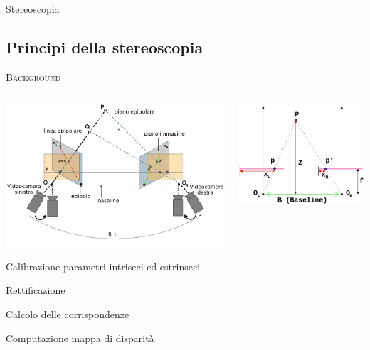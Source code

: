 \documentclass{beamer}
\begin{document}
\begin{section}{Stereoscopia}
\subsection{Principi della stereoscopia}

\begin{frame}[t]{\textsc{Background}}

\begin{columns}
\begin{column}{5cm}
\includegraphics[width=1.1\linewidth]{./img/rect.png}

\begin{itemize}
\item[1.] \small{Calibrazione parametri intriseci ed estrinseci
\item[2.] Rettificazione
\item[3.] Calcolo delle corrispondenze
\item[4.] Computazione mappa di disparit\`{a}}
\end{itemize}

\end{column}

\begin{column}{5cm}
\includegraphics[width=0.8\linewidth]{./img/depth.jpg}


\end{column}
\end{columns}
\end{frame}
\end{section}
\end{document}
